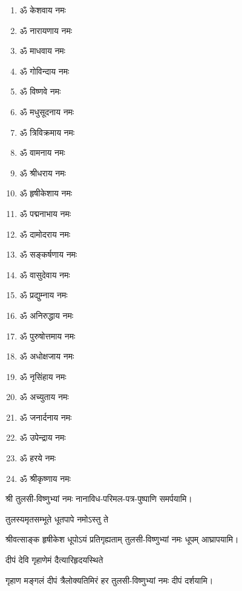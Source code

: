 \begin{multicols}{2}
\begin{enumerate}
\item ॐ केशवाय नमः
\item ॐ नारायणाय नमः
\item ॐ माधवाय नमः
\item ॐ गोविन्दाय नमः
\item ॐ विष्णवे नमः
\item ॐ मधुसूदनाय नमः
\item ॐ त्रिविक्रमाय नमः
\item ॐ वामनाय नमः
\item ॐ श्रीधराय नमः
\item ॐ हृषीकेशाय नमः
\item ॐ पद्मनाभाय नमः
\item ॐ दामोदराय नमः
\item ॐ सङ्कर्षणाय नमः
\item ॐ वासुदेवाय नमः
\item ॐ प्रद्युम्नाय नमः
\item ॐ अनिरुद्धाय नमः
\item ॐ पुरुषोत्तमाय नमः
\item ॐ अधोक्षजाय नमः
\item ॐ नृसिंहाय नमः
\item ॐ अच्युताय नमः
\item ॐ जनार्दनाय नमः
\item ॐ उपेन्द्राय नमः
\item ॐ हरये नमः
\item ॐ श्रीकृष्णाय नमः
\end{enumerate}
\end{multicols}

\begingroup
\centering
\setlength{\columnseprule}{1pt}
\let\chapt\sect


श्री तुलसी-विष्णुभ्यां नमः नानाविध-परिमल-पत्र-पुष्पाणि समर्पयामि।
\endgroup



{तुलस्यमृतसम्भूते धूतपापे नमोऽस्तु ते}

{श्रीवत्साङ्क हृषीकेश धूपोऽयं प्रतिगृह्यताम्}
\hfill{}तुलसी-विष्णुभ्यां नमः धूपम् आघ्रापयामि।

{दीपं देवि गृहाणेमं दैत्यारिहृदयस्थिते}

{गृहाण मङ्गलं दीपं त्रैलोक्यतिमिरं हर}
\hfill{}तुलसी-विष्णुभ्यां नमः दीपं दर्शयामि।

